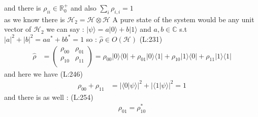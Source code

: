  and there is 
 $ \rho _{i i }\in \mathds{R }_{0}^{+} $  and also 
 $ \sum _{i }\rho _{i ,i }=1 $ \\as we know there is  
 $ \mathcal{H }_{2}=\mathcal{H }\otimes \mathcal{H } $ A pure state of the system would be any unit vector of 
 $ \mathcal{H }_{2} $  we can say : 
 $ |\psi \rangle =a |0\rangle +b |1\rangle  $  and 
 $ a ,b \in \mathds{C } $  s.t
 $ |a |^{2}+|b |^{2}=a a ^*+b b ^*=1 $  so : 
 $ \hat{\rho }\in O (\mathcal{H }) $ (L:231)
\begin{equation}
\begin{split}
\hat{\rho }&=\begin{pmatrix} 
\rho _{00}&\rho _{01}\\
\rho _{10}&\rho _{11}\\
\end{pmatrix} 
=\rho _{00}|0\rangle \langle 0|+\rho _{01}|0\rangle \langle 1|+\rho _{10}|1\rangle \langle 0|+\rho _{11}|1\rangle \langle 1|\end{split}
\end{equation}
 and here we have
(L:246)
\begin{equation}
\begin{split}
\rho _{00}+\rho _{11}&=|{\langle 0|\psi \rangle}|^{2}+|{\langle 1|\psi \rangle}|^{2}=1\end{split}
\end{equation}
 and there is as well : 
(L:254)
\begin{equation}
\begin{split}
\rho _{01}=\rho _{10}^*\end{split}
\end{equation}
